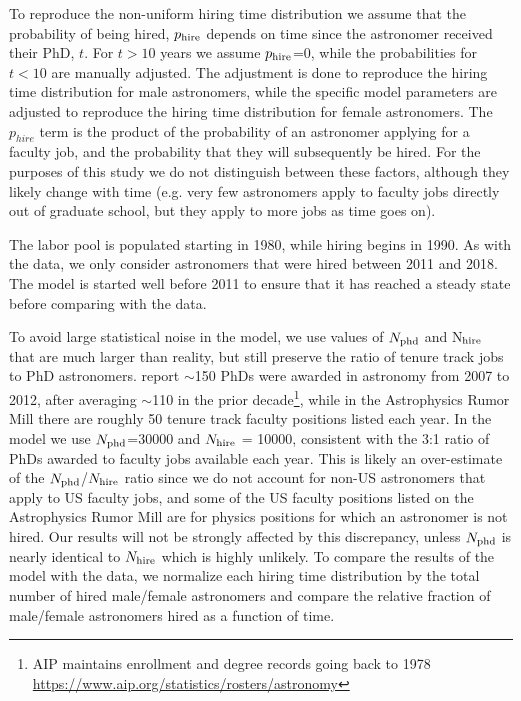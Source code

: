 \documentclass[modern]{aastex62}
\begin{document}
To reproduce the non-uniform hiring time distribution we assume that the probability of being hired, $p_{\rm hire}$ depends on time since the astronomer received their PhD, $t$. For $t>10$ years we assume $p_{\rm hire}$=0, while the probabilities for $t<10$ are manually adjusted. The adjustment is done to reproduce the hiring time distribution for male astronomers, while the specific model parameters are adjusted to reproduce the hiring time distribution for female astronomers. The $p_{hire}$ term is the product of the probability of an astronomer applying for a faculty job, and the probability that they will subsequently be hired. For the purposes of this study we do not distinguish between these factors, although they likely change with time (e.g. very few astronomers apply to faculty jobs directly out of graduate school, but they apply to more jobs as time goes on).

The labor pool is populated starting in 1980, while hiring begins in 1990. As with the data, we only consider astronomers that were hired between 2011 and 2018. The model is started well before 2011 to ensure that it has reached a steady state before comparing with the data.

To avoid large statistical noise in the model, we use values of $N_{\rm phd}$ and N$_{\rm hire}$ that are much larger than reality, but still preserve the ratio of tenure track jobs to PhD astronomers. \citet{mul14} report $\sim$150 PhDs were awarded in astronomy from 2007 to 2012, after averaging $\sim$110 in the prior decade\footnote{AIP maintains enrollment and degree records going back to 1978 \url{https://www.aip.org/statistics/rosters/astronomy}}, while in the Astrophysics Rumor Mill there are roughly 50 tenure track faculty positions listed each year. In the model we use $N_{\rm phd}$=30000 and $N_{\rm hire}$ = 10000, consistent with the 3:1 ratio of PhDs awarded to faculty jobs available each year. This is likely an over-estimate of the $N_{\rm phd}$/$N_{\rm hire}$ ratio since we do not account for non-US astronomers that apply to US faculty jobs, and some of the US faculty positions listed on the Astrophysics Rumor Mill are for physics positions for which an astronomer is not hired. Our results will not be strongly affected by this discrepancy, unless $N_{\rm phd}$ is nearly identical to $N_{\rm hire}$ which is highly unlikely. To compare the results of the model with the data, we normalize each hiring time distribution by the total number of hired male/female astronomers and compare the relative fraction of male/female astronomers hired as a function of time. 
\end{document}
